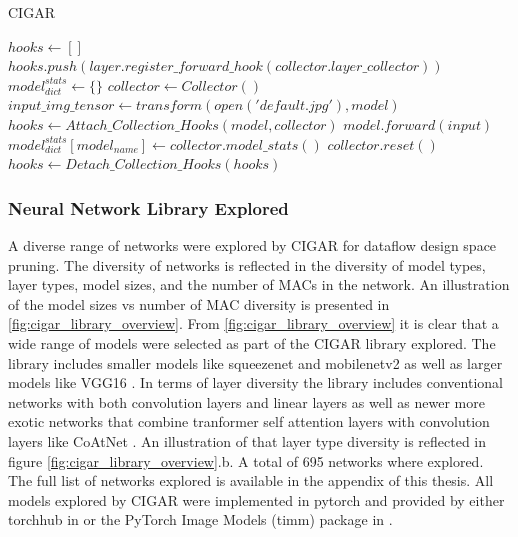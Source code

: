 \begin{algorithm}[H] 
    \caption{\ac{CIGAR}}
    \label{alg:cigar_algo}
    \begin{algorithmic}[1]
    \Statex
        \State $hooks \gets []$
                \State $hooks.push(layer.register\_forward\_hook(collector.layer\_collector))$
            \EndIf 
        \EndFor
    \State {}    
    \EndFunction
    \Statex
        \State $model^{stats}_{dict} \gets \{\}$
        \State $collector \gets Collector()$
            \State $input\_img\_tensor \gets transform(open('default.jpg'), model)$
            \State $hooks \gets Attach\_Collection\_Hooks(model, collector)$
            \State $model.forward(input)$
            \State $model^{stats}_{dict}[model_{name}] \gets collector.model\_stats()$
            \State $collector.reset()$
            \State $hooks \gets Detach\_Collection\_Hooks(hooks)$
        \EndFor
        \State {}
    \EndFunction
    \end{algorithmic}
\end{algorithm}

\subsubsection{Neural Network Library Explored}
\label{chap:dda:dataflow_dse:pruning:cigar:library}

A diverse range of networks were explored by CIGAR for dataflow design space
pruning. The diversity of networks is reflected in the diversity of model types,
layer types, model sizes, and the number of MACs in the network. An illustration
of the model sizes vs number of MAC diversity is presented in
\autoref{fig:cigar_library_overview}. From \autoref{fig:cigar_library_overview}
it is clear that a wide range of models were selected as part of the CIGAR
library explored. The library includes smaller models like squeezenet and
mobilenetv2 as well as larger models like VGG16 \cite{dnn_is_sota_image}.
In terms of layer diversity the library includes conventional networks with both
convolution layers and linear layers as well as newer more exotic networks that
combine tranformer self attention layers with convolution layers like CoAtNet
\cite{xu_co-scale_2021}. An illustration of that layer type diversity is
reflected in figure \autoref{fig:cigar_library_overview}.b. A total of 695 networks where explored.
The full list of networks explored is available in the
appendix of this thesis. All models explored by CIGAR were implemented in
pytorch and provided by either torchhub in \cite{pytorch} or the PyTorch Image
Models (timm) package in \cite{timm}.  

